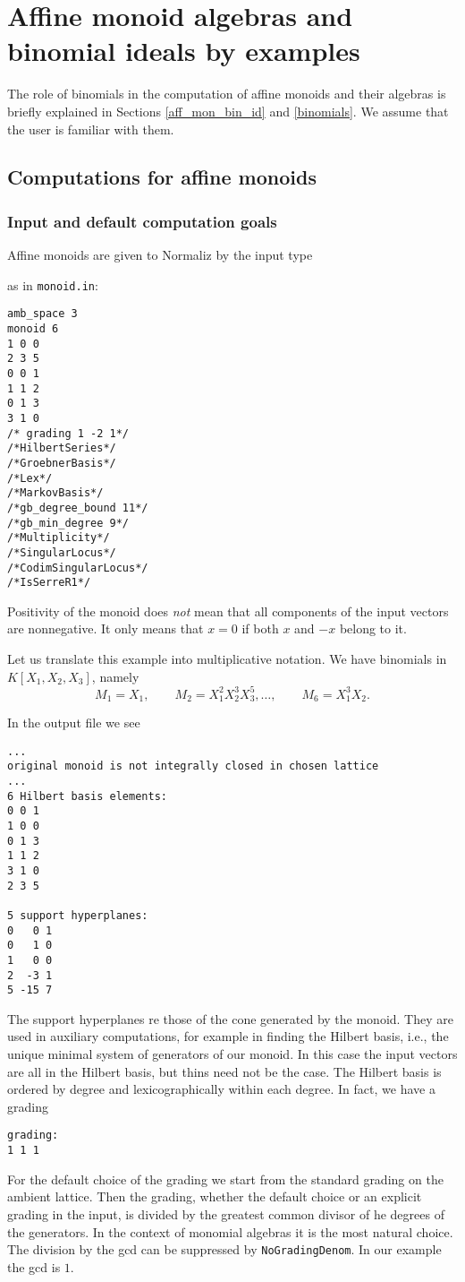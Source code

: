 \section{Affine monoid algebras and binomial ideals by examples}\label{AffMon}

The role of binomials in the computation of affine monoids and their algebras is briefly explained in Sections \ref{aff_mon_bin_id} and \ref{binomials}. We assume that the user is familiar with them.

\subsection{Computations for affine monoids}

\subsubsection{Input and default computation goals}\label{moninp_def}
Affine monoids are given to Normaliz by the input type 
\begin{itemize}
	\itemtt[monoid]
\end{itemize}
as in \verb|monoid.in|:
\begin{Verbatim}
amb_space 3
monoid 6
1 0 0
2 3 5
0 0 1
1 1 2
0 1 3
3 1 0
/* grading 1 -2 1*/
/*HilbertSeries*/
/*GroebnerBasis*/
/*Lex*/
/*MarkovBasis*/
/*gb_degree_bound 11*/
/*gb_min_degree 9*/
/*Multiplicity*/
/*SingularLocus*/
/*CodimSingularLocus*/
/*IsSerreR1*/
\end{Verbatim}
Positivity of the monoid does \emph{not} mean that all components of the input vectors are nonnegative. It only means that $x=0$ if both $x$ and $-x$ belong to it.

Let us translate this example into multiplicative notation. We have binomials in $K[X_1,X_2,X_3]$, namely 
$$
M_1 = X_1,\qquad M_2 = X_1^2X_2^3X_3^5,\dots, \qquad M_6 =X_1^3X_2.
$$

In the output file we see
\begin{Verbatim}
...
original monoid is not integrally closed in chosen lattice
...
6 Hilbert basis elements:
0 0 1
1 0 0
0 1 3
1 1 2
3 1 0
2 3 5

5 support hyperplanes:
0   0 1
0   1 0
1   0 0
2  -3 1
5 -15 7
\end{Verbatim}
The support hyperplanes re those of the cone generated by the monoid. They are used in auxiliary computations, for example in finding the Hilbert basis, i.e., the unique minimal system of generators of our monoid. In this case the input vectors are all in the Hilbert basis, but thins need not be the case. The Hilbert basis is ordered by degree and lexicographically within each degree. In fact, we have a grading
\begin{Verbatim}
grading:
1 1 1 
\end{Verbatim}
For the default choice of the grading we start from the standard grading on the ambient lattice. Then the grading, whether the default choice or an explicit grading in the input, is divided by the greatest common divisor of he degrees of the generators. In the context of monomial algebras it is the most natural choice. The division by the gcd can be suppressed by \verb|NoGradingDenom|. In our example the gcd is $1$.

